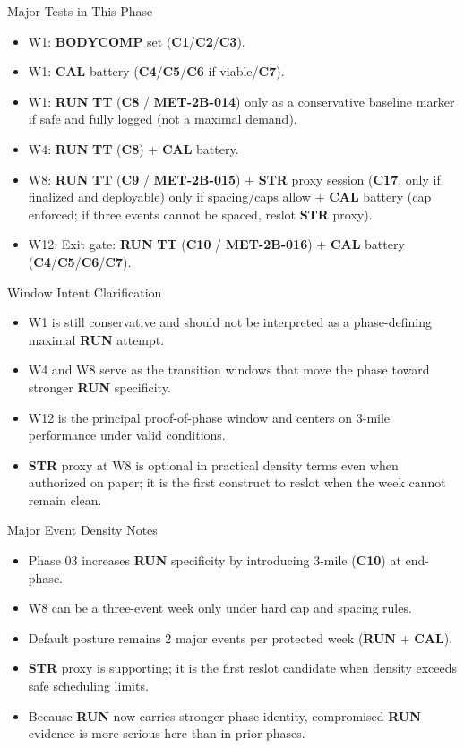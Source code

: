 \documentclass[10pt]{article}
\begin{document}
Major Tests in This Phase

\begin{itemize}
\item W1: \textbf{BODYCOMP} set (\textbf{C1}/\textbf{C2}/\textbf{C3}).
\item W1: \textbf{CAL} battery (\textbf{C4}/\textbf{C5}/\textbf{C6} if viable/\textbf{C7}).
\item W1: \textbf{RUN} \textbf{TT} (\textbf{C8} / \textbf{MET-2B-014}) only as a conservative baseline marker if safe and fully logged (not a maximal demand).
\item W4: \textbf{RUN} \textbf{TT} (\textbf{C8}) + \textbf{CAL} battery.
\item W8: \textbf{RUN} \textbf{TT} (\textbf{C9} / \textbf{MET-2B-015}) + \textbf{STR} proxy session (\textbf{C17}, only if finalized and deployable) only if spacing/caps allow + \textbf{CAL} battery (cap enforced; if three events cannot be spaced, reslot \textbf{STR} proxy).
\item W12: Exit gate: \textbf{RUN} \textbf{TT} (\textbf{C10} / \textbf{MET-2B-016}) + \textbf{CAL} battery (\textbf{C4}/\textbf{C5}/\textbf{C6}/\textbf{C7}).
\end{itemize}

Window Intent Clarification

\begin{itemize}
\item W1 is still conservative and should not be interpreted as a phase-defining maximal \textbf{RUN} attempt.
\item W4 and W8 serve as the transition windows that move the phase toward stronger \textbf{RUN} specificity.
\item W12 is the principal proof-of-phase window and centers on 3-mile performance under valid conditions.
\item \textbf{STR} proxy at W8 is optional in practical density terms even when authorized on paper; it is the first construct to reslot when the week cannot remain clean.
\end{itemize}

Major Event Density Notes

\begin{itemize}
\item Phase 03 increases \textbf{RUN} specificity by introducing 3-mile (\textbf{C10}) at end-phase.
\item W8 can be a three-event week only under hard cap and spacing rules.
\item Default posture remains 2 major events per protected week (\textbf{RUN} + \textbf{CAL}).
\item \textbf{STR} proxy is supporting; it is the first reslot candidate when density exceeds safe scheduling limits.
\item Because \textbf{RUN} now carries stronger phase identity, compromised \textbf{RUN} evidence is more serious here than in prior phases.
\end{itemize}
\end{document}
